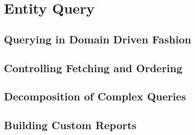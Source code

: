 \chapter{Entity Query}\label{ch:05}

\section{Querying in Domain Driven Fashion}

\section{Controlling Fetching and Ordering}

\section{Decomposition of Complex Queries}

\section{Building Custom Reports}